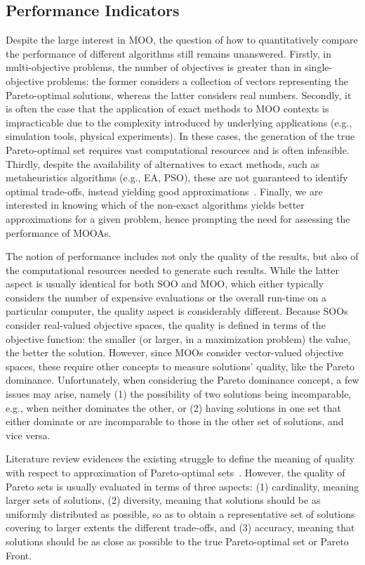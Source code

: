 	\subsection{Performance Indicators}
	\label{ssec:performance}
	Despite the large interest in \ac{MOO}, the question of how to quantitatively compare the performance of different algorithms still remains unanswered. Firstly, in multi-objective problems, the number of objectives is greater than in single-objective problems: the former considers a collection of vectors representing the Pareto-optimal solutions, whereas the latter considers real numbers. Secondly, it is often the case that the application of exact methods to \ac{MOO} contexts is impracticable due to the complexity introduced by underlying applications (e.g., simulation tools, physical experiments). In these cases, the generation of the true Pareto-optimal set requires vast computational resources and is often infeasible. Thirdly, despite the availability of alternatives to exact methods, such as metaheuristics algorithms (e.g., \ac{EA}, \ac{PSO}), these are not guaranteed to identify optimal trade-offs, instead yielding good approximations~\cite{Zitzler2003Metrics}. Finally, we are interested in knowing which of the non-exact algorithms yields better approximations for a given problem, hence prompting the need for assessing the performance of \acp{MOOA}.
	
	The notion of performance includes not only the quality of the results, but also of the computational resources needed to generate such results. While the latter aspect is usually identical for both \ac{SOO} and \ac{MOO}, which either typically considers the number of expensive evaluations or the overall run-time on a particular computer, the quality aspect is considerably different. Because \acp{SOO} consider real-valued objective spaces, the quality is defined in terms of the objective function: the smaller (or larger, in a maximization problem) the value, the better the solution. However, since \acp{MOO} consider vector-valued objective spaces, these require other concepts to measure solutions' quality, like the Pareto dominance. Unfortunately, when considering the Pareto dominance concept, a few issues may arise, namely (1) the possibility of two solutions being incomparable, e.g., when neither dominates the other, or (2) having solutions in one set that either dominate or are incomparable to those in the other set of solutions, and vice versa. 
	
	Literature review evidences the existing struggle to define the meaning of quality with respect to approximation of Pareto-optimal sets~\cite{Knowles2002Metrics,Riquelme2015}. However, the quality of Pareto sets is usually evaluated in terms of three aspects: (1) cardinality, meaning larger sets of solutions, (2) diversity, meaning that solutions should be as uniformly distributed as possible, so as to obtain a representative set of solutions covering to larger extents the different trade-offs, and (3) accuracy, meaning that solutions should be as close as possible to the true Pareto-optimal set or Pareto Front. 
	
